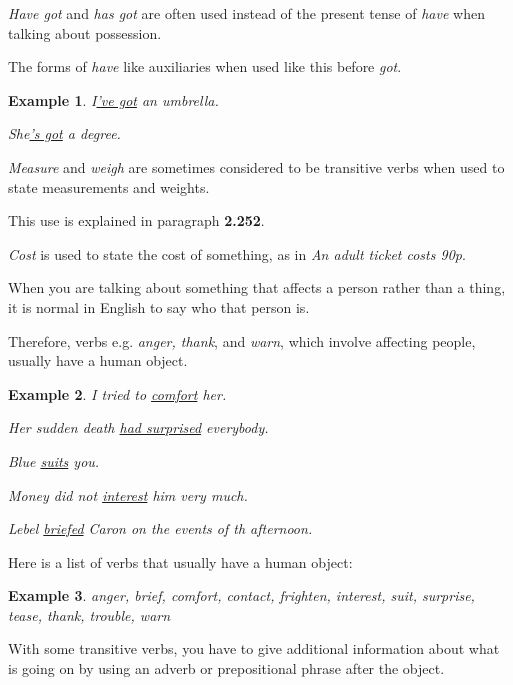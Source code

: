 \documentclass[oneside]{book}
\numberwithin{equation}{section}
\newtheorem{example}{Example}[section]
\begin{document}
%
\textit{Have got} and \textit{has got} are often used instead of the present tense of \textit{have} when talking about possession.

The forms of \textit{have} like auxiliaries when used like this before \textit{got}.
\begin{example}
    I\underline{'ve got} an umbrella.
    
    She\underline{'s got} a degree.
\end{example}
\textit{Measure} and \textit{weigh} are sometimes considered to be transitive verbs when used to state measurements and weights.

This use is explained in paragraph \textbf{2.252}.

\textit{Cost} is used to state the cost of something, as in \textit{An adult ticket costs 90p}.

%
\noindent{} When you are talking about something that affects a person rather than a thing, it is normal in English to say who that person is.

Therefore, verbs e.g. \textit{anger, thank}, and \textit{warn}, which involve affecting people, usually have a human object.
\begin{example}
    I tried to \underline{comfort} her.
    
    Her sudden death \underline{had surprised} everybody.
    
    Blue \underline{suits} you.
    
    Money did not \underline{interest} him very much.
    
    Lebel \underline{briefed} Caron on the events of th afternoon.
\end{example}
%
\noindent{} Here is a list of verbs that usually have a human object:
\begin{example}
    anger, brief, comfort, contact, frighten, interest, suit, surprise, tease, thank, trouble, warn
\end{example}
%
\noindent{} With some transitive verbs, you have to give additional information about what is going on by using an adverb or prepositional phrase after the object.
\end{document}
